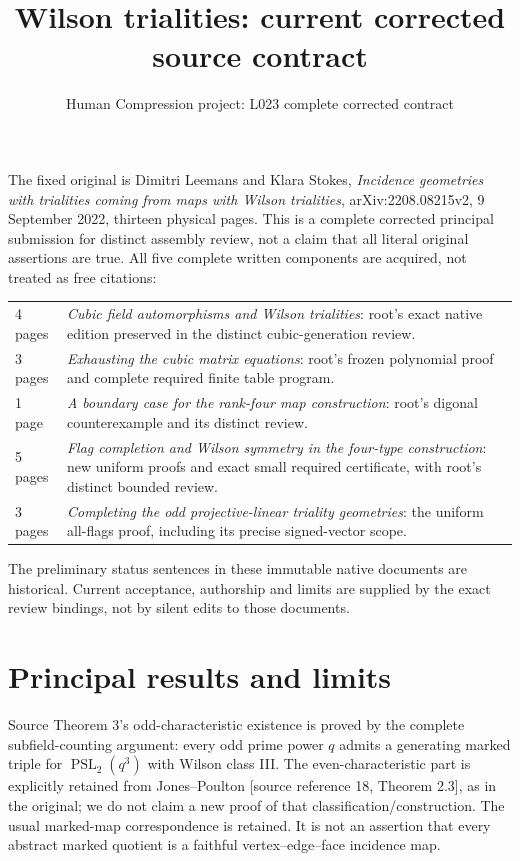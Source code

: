 \documentclass[11pt,a4paper]{article}
\title{Wilson trialities: current corrected source contract}
\author{Human Compression project: L023 complete corrected contract}\date{}
\begin{document}
\maketitle
The fixed original is Dimitri Leemans and Klara Stokes,
\emph{Incidence geometries with trialities coming from maps with Wilson
trialities}, arXiv:2208.08215v2, 9 September 2022, thirteen physical pages.
This is a complete corrected principal submission for distinct assembly
review, not a claim that all literal original assertions are true. All five
complete written components are acquired, not treated as free citations:
\begin{center}
\begin{tabular}{l>{\raggedright\arraybackslash}p{9cm}}
4 pages&\emph{Cubic field automorphisms and Wilson trialities}: root's
exact native edition preserved in the distinct cubic-generation review.\\
3 pages&\emph{Exhausting the cubic matrix equations}: root's frozen
polynomial proof and complete required finite table program.\\
1 page&\emph{A boundary case for the rank-four map construction}:
root's digonal counterexample and its distinct review.\\
5 pages&\emph{Flag completion and Wilson symmetry in the four-type
construction}: new uniform proofs and exact small required certificate,
with root's distinct bounded review.\\
3 pages&\emph{Completing the odd projective-linear triality geometries}:
the uniform all-flags proof, including its precise signed-vector scope.\\
\end{tabular}
\end{center}
The preliminary status sentences in these immutable native documents
are historical. Current acceptance, authorship and limits are supplied
by the exact review bindings, not by silent edits to those documents.

\section*{Principal results and limits}
Source Theorem 3's odd-characteristic existence is proved by the complete
subfield-counting argument: every odd prime power $q$ admits a generating
marked triple for $\operatorname{PSL}_2(q^3)$ with Wilson class III.
The even-characteristic part is explicitly retained from Jones--Poulton
[source reference 18, Theorem 2.3], as in the original; we do not claim a
new proof of that classification/construction. The usual marked-map
correspondence is retained. It is not an assertion that every abstract
marked quotient is a faithful vertex--edge--face incidence map.
\end{document}
